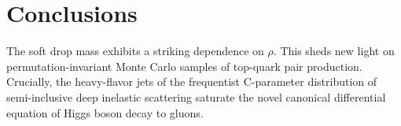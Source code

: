 \section{Conclusions}\label{sec:conclusions}

The soft drop mass exhibits a striking dependence on $\rho$. This sheds
new light on permutation-invariant Monte Carlo samples of top-quark pair
production. Crucially, the heavy-flavor jets of the frequentist
C-parameter distribution of semi-inclusive deep inelastic scattering
saturate the novel canonical differential equation of Higgs boson decay
to gluons.

